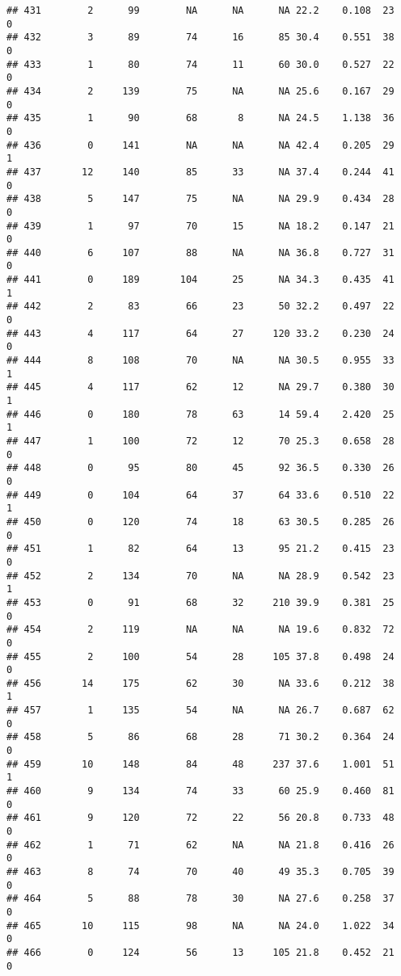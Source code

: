 \documentclass[
]{article}
\begin{document}
\begin{verbatim}
## 431        2      99        NA      NA      NA 22.2    0.108  23    0
## 432        3      89        74      16      85 30.4    0.551  38    0
## 433        1      80        74      11      60 30.0    0.527  22    0
## 434        2     139        75      NA      NA 25.6    0.167  29    0
## 435        1      90        68       8      NA 24.5    1.138  36    0
## 436        0     141        NA      NA      NA 42.4    0.205  29    1
## 437       12     140        85      33      NA 37.4    0.244  41    0
## 438        5     147        75      NA      NA 29.9    0.434  28    0
## 439        1      97        70      15      NA 18.2    0.147  21    0
## 440        6     107        88      NA      NA 36.8    0.727  31    0
## 441        0     189       104      25      NA 34.3    0.435  41    1
## 442        2      83        66      23      50 32.2    0.497  22    0
## 443        4     117        64      27     120 33.2    0.230  24    0
## 444        8     108        70      NA      NA 30.5    0.955  33    1
## 445        4     117        62      12      NA 29.7    0.380  30    1
## 446        0     180        78      63      14 59.4    2.420  25    1
## 447        1     100        72      12      70 25.3    0.658  28    0
## 448        0      95        80      45      92 36.5    0.330  26    0
## 449        0     104        64      37      64 33.6    0.510  22    1
## 450        0     120        74      18      63 30.5    0.285  26    0
## 451        1      82        64      13      95 21.2    0.415  23    0
## 452        2     134        70      NA      NA 28.9    0.542  23    1
## 453        0      91        68      32     210 39.9    0.381  25    0
## 454        2     119        NA      NA      NA 19.6    0.832  72    0
## 455        2     100        54      28     105 37.8    0.498  24    0
## 456       14     175        62      30      NA 33.6    0.212  38    1
## 457        1     135        54      NA      NA 26.7    0.687  62    0
## 458        5      86        68      28      71 30.2    0.364  24    0
## 459       10     148        84      48     237 37.6    1.001  51    1
## 460        9     134        74      33      60 25.9    0.460  81    0
## 461        9     120        72      22      56 20.8    0.733  48    0
## 462        1      71        62      NA      NA 21.8    0.416  26    0
## 463        8      74        70      40      49 35.3    0.705  39    0
## 464        5      88        78      30      NA 27.6    0.258  37    0
## 465       10     115        98      NA      NA 24.0    1.022  34    0
## 466        0     124        56      13     105 21.8    0.452  21    0

\end{verbatim}
\end{document}
